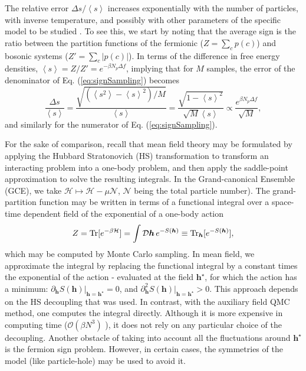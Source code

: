 The relative error $\Delta s / \left\langle s \right\rangle$ increases exponentially with the number of particles, with inverse temperature, and possibly with other parameters of the specific model to be studied \cite{troyer_computational_2005, hou_numerical_2009}.
To see this, we start by noting that the average sign is the ratio between the partition functions of the fermionic ($Z = \sum_c p(c)$) and bosonic systems ($Z' = \sum_c | p ( c ) |$).
In terms of the difference in free energy densities, $\left\langle s \right\rangle = Z / Z' = e^{-\beta N_p \Delta f}$, implying that for $M$ samples, the error of the denominator of Eq. (\ref{eq:signSampling}) becomes
\begin{equation}
\frac{\Delta s}{\left\langle s \right\rangle} = \frac{\sqrt{(\left\langle s^2 \right\rangle - \left\langle s \right\rangle^2 )/ M }}{\left\langle s \right\rangle} = \frac{ \sqrt{ 1 - \left\langle s \right\rangle^2}  }{\sqrt{M} \left\langle s \right\rangle} \propto \frac{e^{\beta N_p \Delta f}}{\sqrt{M}} ,
\end{equation}
and similarly for the numerator of Eq. (\ref{eq:signSampling}).

For the sake of comparison, recall that mean field theory may be formulated by applying the Hubbard Stratonovich (HS)  transformation to transform an interacting problem into a one-body problem, and then apply the saddle-point approximation to solve the resulting integrals.
In the Grand-canonical Ensemble (GCE), we take $\mathcal{H} \mapsto \mathcal{H} - \mu \mathcal{N}$, $\mathcal{N}$ being the total particle number).
The grand-partition function may be written in terms of a functional integral over a space-time dependent field of the exponential of a one-body action
\begin{equation}
Z = \operatorname{Tr} [ e^{-\beta \mathcal{H} } ] = \int \mathcal{D}\bm h \, e^{-S(\bm h) }  \equiv \operatorname{Tr}_{\bm h} [ e^{-S(\bm h)} ],
\end{equation}
which may be computed by Monte Carlo sampling.
In mean field, we approximate the integral by replacing the functional integral by a constant times the exponential of the action - evaluated at the field $\bm h^\star$, for which the action has a minimum: $\partial_{\bm h} S( \bm h ) |_{\bm h = \bm h^\star} = 0$, and $\partial_{\bm h}^2 S( \bm h ) |_{\bm h = \bm h^\star} > 0$.
This approach depends on the HS decoupling that was used.
In contrast, with the auxiliary field QMC method, one computes the integral directly.
Although it is more expensive in computing time ($\mathcal{O}(\beta N^3)$ ), it does not rely on any particular choice of the decoupling.
Another obstacle of taking into account all the fluctuations around $\bm h^\star$ is the fermion sign problem.
However, in certain cases, the symmetries of the model (like particle-hole) may be used to avoid it.

